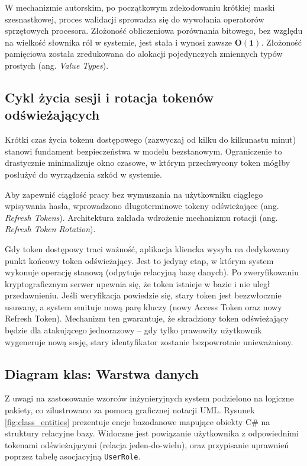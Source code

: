 \documentclass{SGGW-thesis}
\begin{document}
W mechanizmie autorskim, po początkowym zdekodowaniu krótkiej maski szesnastkowej, proces walidacji sprowadza się do wywołania operatorów sprzętowych procesora. Złożoność obliczeniowa porównania bitowego, bez względu na wielkość słownika ról w systemie, jest stała i wynosi zawsze $\boldsymbol{O(1)}$. Złożoność pamięciowa została zredukowana do alokacji pojedynczych zmiennych typów prostych (ang. \textit{Value Types}).

\subsection{Cykl życia sesji i rotacja tokenów odświeżających}

Krótki czas życia tokenu dostępowego (zazwyczaj od kilku do kilkunastu minut) stanowi fundament bezpieczeństwa w modelu bezstanowym. Ograniczenie to drastycznie minimalizuje okno czasowe, w którym przechwycony token mógłby posłużyć do wyrządzenia szkód w systemie.

Aby zapewnić ciągłość pracy bez wymuszania na użytkowniku ciągłego wpisywania hasła, wprowadzono długoterminowe tokeny odświeżające (ang. \textit{Refresh Tokens}). Architektura zakłada wdrożenie mechanizmu rotacji (ang. \textit{Refresh Token Rotation}). 

Gdy token dostępowy traci ważność, aplikacja kliencka wysyła na dedykowany punkt końcowy token odświeżający. Jest to jedyny etap, w którym system wykonuje operację stanową (odpytuje relacyjną bazę danych). Po zweryfikowaniu kryptograficznym serwer upewnia się, że token istnieje w bazie i nie uległ przedawnieniu. Jeśli weryfikacja powiedzie się, stary token jest bezzwłocznie usuwany, a system emituje nową parę kluczy (nowy Access Token oraz nowy Refresh Token). Mechanizm ten gwarantuje, że skradziony token odświeżający będzie dla atakującego jednorazowy – gdy tylko prawowity użytkownik wygeneruje nową sesję, stary identyfikator zostanie bezpowrotnie unieważniony.

\subsection{Diagram klas: Warstwa danych}

Z uwagi na zastosowanie wzorców inżynieryjnych system podzielono na logiczne pakiety, co zilustrowano za pomocą graficznej notacji UML. Rysunek \ref{fig:class_entities} prezentuje encje bazodanowe mapujące obiekty C\# na struktury relacyjne bazy. Widoczne jest powiązanie użytkownika z odpowiednimi tokenami odświeżającymi (relacja jeden-do-wielu), oraz przypisanie uprawnień poprzez tabelę asocjacyjną \texttt{UserRole}.
\end{document}
